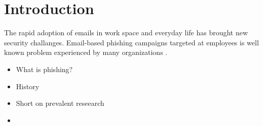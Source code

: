 

\pagestyle{plain} %
\setcounter{page}{1}
\chapter{Introduction}
The rapid adoption of emails in work space and everyday life has brought new security challanges. Email-based phishing campaigns targeted at employees is well known problem experienced by many organizations \cite{jampen}.

\begin{itemize}
    \item What is phishing?
    \item History
    \item Short on prevalent reseearch
    \item
\end{itemize}